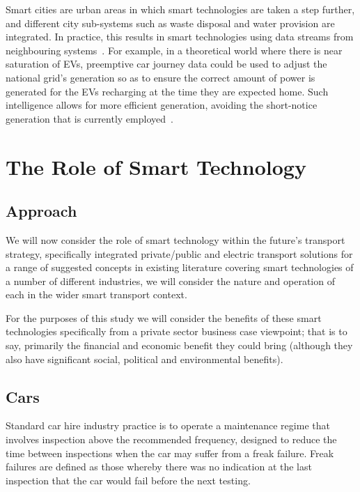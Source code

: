 \documentclass[journal]{IEEEtran}
\begin{document}
Smart cities are urban areas in which smart technologies are taken a
step further, and different city sub-systems such as waste disposal
and water provision are integrated. In practice, this results in smart
technologies using data streams from neighbouring
systems~\cite{shapiro:2006}. For example, in a theoretical world where
there is near saturation of EVs, preemptive car journey data could be
used to adjust the national grid's generation so as to ensure the
correct amount of power is generated for the EVs recharging at the
time they are expected home. Such intelligence allows for more
efficient generation, avoiding the short-notice generation that is
currently employed~\cite{tsoukalas:2008}.

\section{The Role of Smart Technology}

\subsection{Approach}

We will now consider the role of smart technology within the future’s
transport strategy, specifically integrated private/public and
electric transport solutions for a range of suggested concepts in
existing literature covering smart technologies of a number of
different industries, we will consider the nature and operation of
each in the wider smart transport context.


For the purposes of this study we will consider the benefits of these
smart technologies specifically from a private sector business case
viewpoint; that is to say, primarily the financial and economic
benefit they could bring (although they also have significant social,
political and environmental benefits).

\subsection{Cars}

Standard car hire industry practice is to operate a maintenance regime
that involves inspection above the recommended frequency, designed to
reduce the time between inspections when the car may suffer from a
freak failure. Freak failures are defined as those whereby there was
no indication at the last inspection that the car would fail before
the next testing.
\end{document}
